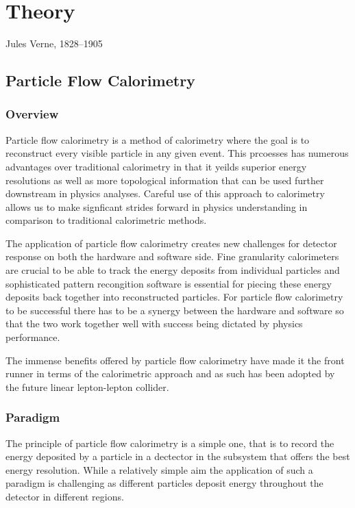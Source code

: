 \chapter{Theory}
\label{chap:theory}

{Jules Verne, 1828--1905}

\section{Particle Flow Calorimetry}
\label{sec:unitarisation}

\subsection{Overview}

Particle flow calorimetry is a method of calorimetry where the goal is to reconstruct every visible particle in any given event.  This prcoesses has numerous advantages over traditional calorimetry in that it yeilds superior energy resolutions as well as more topological information that can be used further downstream in physics analyses.  Careful use of this approach to calorimetry allows us to make signficant strides forward in physics understanding in comparison to traditional calorimetric methods.

The application of particle flow calorimetry creates new challenges for detector response on both the hardware and software side.  Fine granularity calorimeters are crucial to be able to track the energy deposits from individual particles and sophisticated pattern recongition software is essential for piecing these energy deposits back together into reconstructed particles.  For particle flow calorimetry to be successful there has to be a synergy between the hardware and software so that the two work together well with success being dictated by physics performance.  

The immense benefits offered by particle flow calorimetry have made it the front runner in terms of the calorimetric approach and as such has been adopted by the future linear lepton-lepton collider.  

\subsection{Paradigm}

The principle of particle flow calorimetry is a simple one, that is to record the energy deposited by a particle in a dectector in the subsystem that offers the best energy resolution.  While a relatively simple aim the application of such a paradigm is challenging as different particles deposit energy throughout the detector in different regions.  

